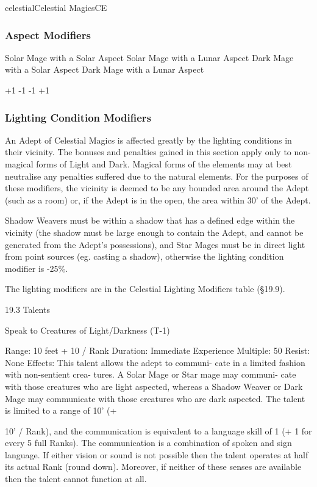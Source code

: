\begin{College}[1.3]{celestial}{Celestial Magics}{CE}
\subsubsection{Aspect Modifiers}

Solar Mage with a Solar Aspect 
Solar Mage with a Lunar Aspect 
Dark Mage with a Solar Aspect 
Dark Mage with a Lunar Aspect 

+1%
-1%
-1%
+1%

\subsubsection{Lighting Condition Modifiers}

An Adept of Celestial Magics is affected greatly by the lighting
conditions in their vicinity.  The bonuses and penalties gained in
this section apply only to non-magical forms of Light and Dark.
Magical forms of the elements may at best neutralise any penalties
suffered due to the natural elements.  For the purposes of these
modifiers, the vicinity is deemed to be any bounded area around the
Adept (such as a room) or, if the Adept is in the open, the area
within 30’ of the Adept.

Shadow Weavers must be within a shadow that has a defined edge within
the vicinity (the shadow must be large enough to contain the Adept,
and cannot be generated from the Adept’s possessions), and Star Mages
must be in direct light from point sources (eg. casting a shadow),
otherwise the lighting condition modifier is -25\%.

The lighting modifiers are in the Celestial Lighting Modifiers table
(§19.9).

19.3 Talents 

Speak to Creatures of Light/Darkness (T-1) 

Range: 10 feet + 10 / Rank 
Duration: Immediate 
Experience Multiple: 50 
Resist: None 
Effects:  This  talent  allows  the  adept  to  communi-
cate  in  a  limited  fashion  with  non-sentient  crea-
tures.  A  Solar  Mage  or  Star  mage  may  communi-
cate  with  those  creatures  who  are  light  aspected, 
whereas  a  Shadow  Weaver  or  Dark  Mage  may 
communicate  with  those  creatures  who  are  dark 
aspected. The talent is limited to a range of 10’ (+ 

10’  /  Rank),  and  the  communication  is  equivalent 
to a language skill of 1 (+ 1 for every 5 full Ranks). 
The  communication  is  a  combination  of  spoken 
and  sign  language.  If  either  vision  or  sound is  not 
possible  then  the  talent  operates  at  half  its  actual 
Rank  (round  down).  Moreover,  if  neither  of  these 
senses are available then the talent cannot function 
at all. 


\end{College}
